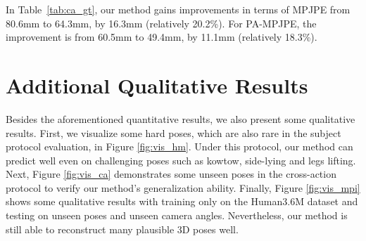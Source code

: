\documentclass[runningheads]{llncs}
\begin{document}
In Table~\ref{tab:ca_gt}, our method gains improvements in terms of MPJPE from 80.6mm to 64.3mm, by 16.3mm (relatively 20.2\%). For PA-MPJPE, the improvement is from 60.5mm to 49.4mm, by 11.1mm (relatively 18.3\%).


\begin{table*}
\begin{center}
\end{center}
\caption{\emph{Cross Action} comparison to the FCN baseline with \emph{2D ground truth input} on Human3.6M in terms of mean per-joint position error (MPJPE) and PA-MPJPE (denoted by ).}
\label{tab:ca_gt}
\end{table*}








\section{Additional Qualitative Results}
\label{sec:visual}
Besides the aforementioned quantitative results, we also present some qualitative results. First, we visualize some hard poses, which are also rare in the subject protocol evaluation, in Figure \ref{fig:vis_hm}. Under this protocol, our method can predict well even on challenging poses such as kowtow, side-lying and legs lifting. Next, Figure \ref{fig:vis_ca} demonstrates some unseen poses in the cross-action protocol to verify our method's generalization ability. 
Finally, Figure \ref{fig:vis_mpi} shows some qualitative results with training only on the Human3.6M dataset and testing on unseen poses and unseen camera angles. Nevertheless, our method is still able to reconstruct many plausible 3D poses well.
\end{document}
